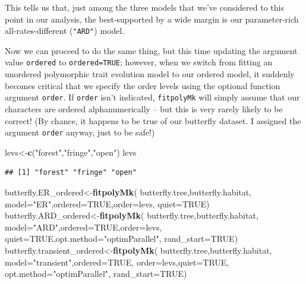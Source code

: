 \documentclass[fleqn,10pt,lineno]{wlpeerj} %
\newenvironment{Shaded}{\begin{snugshade}}{\end{snugshade}}
\newcommand{\AttributeTok}[1]{\textcolor[rgb]{0.13,0.29,0.53}{#1}}
\newcommand{\ConstantTok}[1]{\textcolor[rgb]{0.56,0.35,0.01}{#1}}
\newcommand{\FunctionTok}[1]{\textcolor[rgb]{0.13,0.29,0.53}{\textbf{#1}}}
\newcommand{\NormalTok}[1]{#1}
\newcommand{\OtherTok}[1]{\textcolor[rgb]{0.56,0.35,0.01}{#1}}
\newcommand{\StringTok}[1]{\textcolor[rgb]{0.31,0.60,0.02}{#1}}
\begin{document}
This tells us that, just among the three models that we've considered to this point in our analysis, the best-supported by a wide margin is our parameter-rich all-rates-different (\texttt{"ARD"}) model.

Now we can proceed to do the same thing, but this time updating the argument value \texttt{ordered} to \texttt{ordered=TRUE}; however, when we switch from fitting an unordered polymorphic trait evolution model to our ordered model, it suddenly becomes critical that we specify the order levels using the optional function argument \texttt{order}. If \texttt{order} isn't indicated, \texttt{fitpolyMk} will simply assume that our characters are ordered alphanumerically -- but this is very rarely likely to be correct! (By chance, it happens to be true of our butterfly dataset. I assigned the argument \texttt{order} anyway, just to be safe!)

\begin{Shaded}
\begin{Highlighting}[]
\NormalTok{levs}\OtherTok{\textless{}{-}}\FunctionTok{c}\NormalTok{(}\StringTok{"forest"}\NormalTok{,}\StringTok{"fringe"}\NormalTok{,}\StringTok{"open"}\NormalTok{)}
\NormalTok{levs}
\end{Highlighting}
\end{Shaded}

\begin{verbatim}
## [1] "forest" "fringe" "open"
\end{verbatim}

\begin{Shaded}
\begin{Highlighting}[]
\NormalTok{butterfly.ER\_ordered}\OtherTok{\textless{}{-}}\FunctionTok{fitpolyMk}\NormalTok{(}
\NormalTok{  butterfly.tree,butterfly.habitat,}
  \AttributeTok{model=}\StringTok{"ER"}\NormalTok{,}\AttributeTok{ordered=}\ConstantTok{TRUE}\NormalTok{,}\AttributeTok{order=}\NormalTok{levs,}
  \AttributeTok{quiet=}\ConstantTok{TRUE}\NormalTok{)}
\NormalTok{butterfly.ARD\_ordered}\OtherTok{\textless{}{-}}\FunctionTok{fitpolyMk}\NormalTok{(}
\NormalTok{  butterfly.tree,butterfly.habitat,}
  \AttributeTok{model=}\StringTok{"ARD"}\NormalTok{,}\AttributeTok{ordered=}\ConstantTok{TRUE}\NormalTok{,}\AttributeTok{order=}\NormalTok{levs,}
  \AttributeTok{quiet=}\ConstantTok{TRUE}\NormalTok{,}\AttributeTok{opt.method=}\StringTok{"optimParallel"}\NormalTok{,}
  \AttributeTok{rand\_start=}\ConstantTok{TRUE}\NormalTok{)}
\NormalTok{butterfly.transient\_ordered}\OtherTok{\textless{}{-}}\FunctionTok{fitpolyMk}\NormalTok{(}
\NormalTok{  butterfly.tree,butterfly.habitat,}
  \AttributeTok{model=}\StringTok{"transient"}\NormalTok{,}\AttributeTok{ordered=}\ConstantTok{TRUE}\NormalTok{,}
  \AttributeTok{order=}\NormalTok{levs,}\AttributeTok{quiet=}\ConstantTok{TRUE}\NormalTok{,}
  \AttributeTok{opt.method=}\StringTok{"optimParallel"}\NormalTok{,}
  \AttributeTok{rand\_start=}\ConstantTok{TRUE}\NormalTok{)}
\end{Highlighting}
\end{Shaded}
\end{document}
